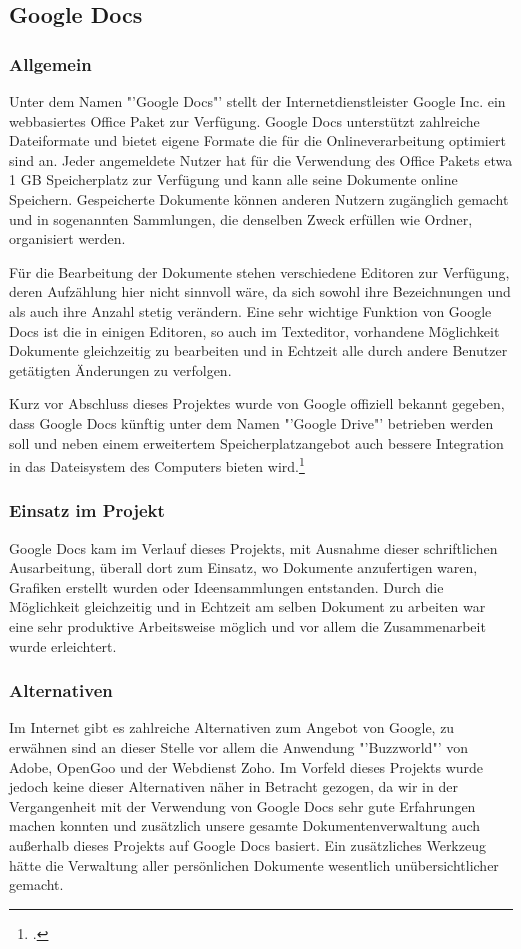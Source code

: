 \subsection{Google Docs}
\subsubsection{Allgemein}
Unter dem Namen "'Google Docs"' stellt der Internetdienstleister Google Inc. ein webbasiertes Office Paket zur Verfügung. Google Docs unterstützt zahlreiche Dateiformate und bietet eigene Formate die für die Onlineverarbeitung optimiert sind an. Jeder angemeldete Nutzer hat für die Verwendung des Office Pakets etwa 1 GB Speicherplatz zur Verfügung und kann alle seine Dokumente online Speichern. 
Gespeicherte Dokumente können anderen Nutzern zugänglich gemacht und in sogenannten Sammlungen, die denselben Zweck erfüllen wie Ordner, organisiert werden.

Für die Bearbeitung der Dokumente stehen verschiedene Editoren zur Verfügung, deren Aufzählung hier nicht sinnvoll wäre, da sich sowohl ihre Bezeichnungen und als auch ihre Anzahl stetig verändern.
Eine sehr wichtige Funktion von Google Docs ist die in einigen Editoren, so auch im Texteditor, vorhandene Möglichkeit Dokumente gleichzeitig zu bearbeiten und in Echtzeit alle durch andere Benutzer getätigten Änderungen zu verfolgen.

Kurz vor Abschluss dieses Projektes wurde von Google offiziell bekannt gegeben, dass Google Docs künftig unter dem Namen "'Google Drive"' betrieben werden soll und neben einem erweitertem Speicherplatzangebot auch bessere Integration in das Dateisystem des Computers bieten wird.\footcite[vgl.][]{googledocs}
\subsubsection{Einsatz im Projekt}
Google Docs kam im Verlauf dieses Projekts, mit Ausnahme dieser schriftlichen Ausarbeitung, überall dort zum Einsatz, wo Dokumente anzufertigen waren, Grafiken erstellt wurden oder Ideensammlungen entstanden. Durch die Möglichkeit gleichzeitig und in Echtzeit am selben Dokument zu arbeiten war eine sehr produktive Arbeitsweise möglich und vor allem die Zusammenarbeit wurde erleichtert.  
\subsubsection{Alternativen}
Im Internet gibt es zahlreiche Alternativen zum Angebot von Google, zu erwähnen sind an dieser Stelle vor allem die Anwendung "'Buzzworld"' von Adobe, OpenGoo und der Webdienst Zoho. Im Vorfeld dieses Projekts wurde jedoch keine dieser Alternativen näher in Betracht gezogen, da wir in der Vergangenheit mit der Verwendung von Google Docs sehr gute Erfahrungen machen konnten und zusätzlich unsere gesamte Dokumentenverwaltung auch außerhalb dieses Projekts auf Google Docs basiert. Ein zusätzliches Werkzeug hätte die Verwaltung aller persönlichen Dokumente wesentlich unübersichtlicher gemacht.